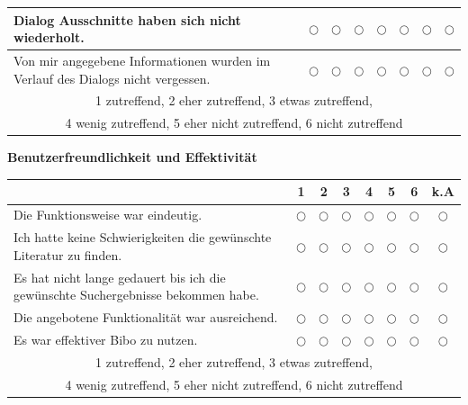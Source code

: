 \documentclass[12pt,a4paper]{scrartcl}
\begin{document}
\begin{enumerate}
\begin{itemize}
\begin{center}
\begin{tabularx}{\linewidth}{|X|cccccc|c|}
Dialog Ausschnitte haben sich nicht wiederholt. & $\bigcirc$ & $\bigcirc$ & $\bigcirc$ & $\bigcirc$  & $\bigcirc$  & $\bigcirc$  &$\bigcirc$ \\ \hline

Von mir angegebene Informationen wurden im Verlauf des Dialogs nicht vergessen. & $\bigcirc$ & $\bigcirc$ & $\bigcirc$ & $\bigcirc$  & $\bigcirc$  & $\bigcirc$  &$\bigcirc$ \\ \hline
\multicolumn{8}{|c|}{1 zutreffend, 2 eher zutreffend, 3 etwas zutreffend,}\\
\multicolumn{8}{|c|}{4 wenig zutreffend, 5 eher nicht zutreffend, 6 nicht zutreffend} \\ \hline


\end{tabularx}
\end{center}
\newpage
\textbf{Benutzerfreundlichkeit und Effektivität}
\begin{center}
\begin{tabularx}{\linewidth}{|X|cccccc|c|}

\hline
&1&2&3&4 &5 &6 &k.A \\ \hline

Die Funktionsweise war eindeutig. & $\bigcirc$ & $\bigcirc$ & $\bigcirc$ & $\bigcirc$  & $\bigcirc$  & $\bigcirc$  &$\bigcirc$ \\ \hline

Ich hatte keine Schwierigkeiten die gewünschte Literatur zu finden. & $\bigcirc$ & $\bigcirc$ & $\bigcirc$ & $\bigcirc$  & $\bigcirc$  & $\bigcirc$  &$\bigcirc$ \\ \hline

Es hat nicht lange gedauert bis ich die gewünschte Suchergebnisse bekommen habe.& $\bigcirc$ & $\bigcirc$ & $\bigcirc$ & $\bigcirc$  & $\bigcirc$  & $\bigcirc$  &$\bigcirc$ \\ \hline

Die angebotene Funktionalität war ausreichend.& $\bigcirc$ & $\bigcirc$ & $\bigcirc$ & $\bigcirc$  & $\bigcirc$  & $\bigcirc$  &$\bigcirc$ \\ \hline

Es war effektiver Bibo zu nutzen. & $\bigcirc$ & $\bigcirc$ & $\bigcirc$ & $\bigcirc$  & $\bigcirc$  & $\bigcirc$  &$\bigcirc$ \\ \hline

\multicolumn{8}{|c|}{1 zutreffend, 2 eher zutreffend, 3 etwas zutreffend,}\\
\multicolumn{8}{|c|}{4 wenig zutreffend, 5 eher nicht zutreffend, 6 nicht zutreffend} \\ \hline


\end{tabularx}
\end{center}
\end{itemize}
\end{enumerate}
\end{document}
